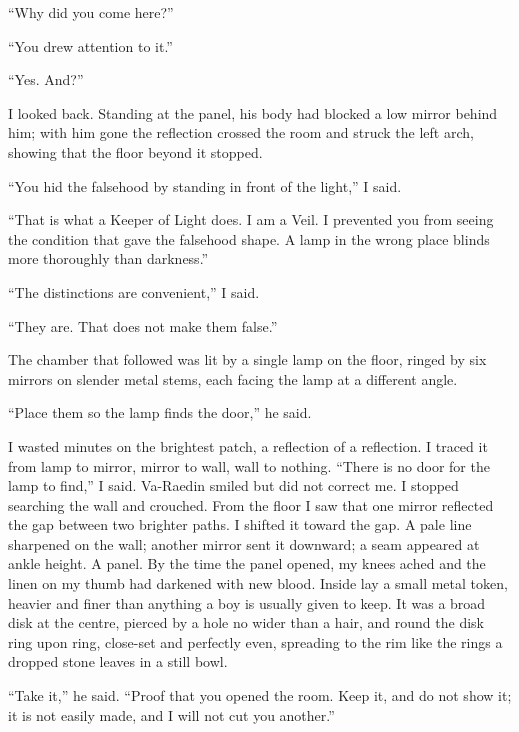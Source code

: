 ``Why did you come here?''\par
``You drew attention to it.''\par
``Yes. And?''\par

I looked back. Standing at the panel, his body had blocked a low mirror behind him; with him gone the reflection crossed the room and struck the left arch, showing that the floor beyond it stopped.\par

``You hid the falsehood by standing in front of the light,'' I said.\par
``That is what a Keeper of Light does. I am a Veil. I prevented you from seeing the condition that gave the falsehood shape. A lamp in the wrong place blinds more thoroughly than darkness.''\par

``The distinctions are convenient,'' I said.\par

``They are. That does not make them false.''\par

\ornament

The chamber that followed was lit by a single lamp on the floor, ringed by six mirrors on slender metal stems, each facing the lamp at a different angle. 

``Place them so the lamp finds the door,'' he said. \par

I wasted minutes on the brightest patch, a reflection of a reflection. I traced it from lamp to mirror, mirror to wall, wall to nothing. ``There is no door for the lamp to find,'' I said. Va-Raedin smiled but did not correct me. I stopped searching the wall and crouched. From the floor I saw that one mirror reflected the gap between two brighter paths. I shifted it toward the gap. A pale line sharpened on the wall; another mirror sent it downward; a seam appeared at ankle height. A panel. By the time the panel opened, my knees ached and the linen on my thumb had darkened with new blood. Inside lay a small metal token, heavier and finer than anything a boy is usually given to keep. It was a broad disk at the centre, pierced by a hole no wider than a hair, and round the disk ring upon ring, close-set and perfectly even, spreading to the rim like the rings a dropped stone leaves in a still bowl.\par

``Take it,'' he said. ``Proof that you opened the room. Keep it, and do not show it; it is not easily made, and I will not cut you another.''\par

